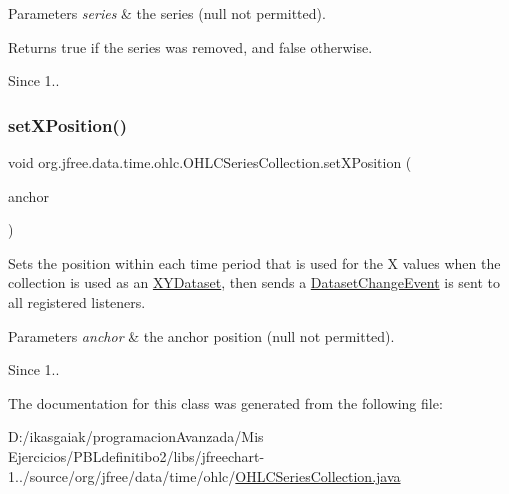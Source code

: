 \begin{DoxyParams}{Parameters}
{\em series} & the series ({\ttfamily null} not permitted).\\
\hline
\end{DoxyParams}
\begin{DoxyReturn}{Returns}
{\ttfamily true} if the series was removed, and {\ttfamily false} otherwise.
\end{DoxyReturn}
\begin{DoxySince}{Since}
1.. 
\end{DoxySince}
\mbox{\label{classorg_1_1jfree_1_1data_1_1time_1_1ohlc_1_1_o_h_l_c_series_collection_a865e3bc31c8989a62138249a145a3c55}} 
\subsubsection{\texorpdfstring{set\+X\+Position()}{setXPosition()}}
{\footnotesize\ttfamily void org.\+jfree.\+data.\+time.\+ohlc.\+O\+H\+L\+C\+Series\+Collection.\+set\+X\+Position (\begin{DoxyParamCaption}\item[{\mbox{\hyperlink{classorg_1_1jfree_1_1data_1_1time_1_1_time_period_anchor}{Time\+Period\+Anchor}}}]{anchor }\end{DoxyParamCaption})}

Sets the position within each time period that is used for the X values when the collection is used as an \mbox{\hyperlink{}{X\+Y\+Dataset}}, then sends a \mbox{\hyperlink{}{Dataset\+Change\+Event}} is sent to all registered listeners.


\begin{DoxyParams}{Parameters}
{\em anchor} & the anchor position ({\ttfamily null} not permitted).\\
\hline
\end{DoxyParams}
\begin{DoxySince}{Since}
1.. 
\end{DoxySince}


The documentation for this class was generated from the following file\+:\begin{DoxyCompactItemize}
\item 
D\+:/ikasgaiak/programacion\+Avanzada/\+Mis Ejercicios/\+P\+B\+Ldefinitibo2/libs/jfreechart-\/1../source/org/jfree/data/time/ohlc/\mbox{\hyperlink{_o_h_l_c_series_collection_8java}{O\+H\+L\+C\+Series\+Collection.\+java}}\end{DoxyCompactItemize}
